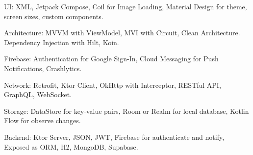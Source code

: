 \begin{cvparagraph}

UI: XML, Jetpack Compose, Coil for Image Loading, Material Design for theme, screen sizes, custom components.

Architecture: MVVM with ViewModel, MVI with Circuit, Clean Architecture. Dependency Injection with Hilt, Koin.

Firebase: Authentication for Google Sign-In, Cloud Messaging for Push Notifications, Crashlytics.

Network: Retrofit, Ktor Client, OkHttp with Interceptor, RESTful API, GraphQL, WebSocket.

Storage: DataStore for key-value pairs, Room or Realm for local database, Kotlin Flow for observe changes.

Backend: Ktor Server, JSON, JWT, Firebase for authenticate and notify, Exposed as ORM, H2, MongoDB, Supabase.

\end{cvparagraph}
